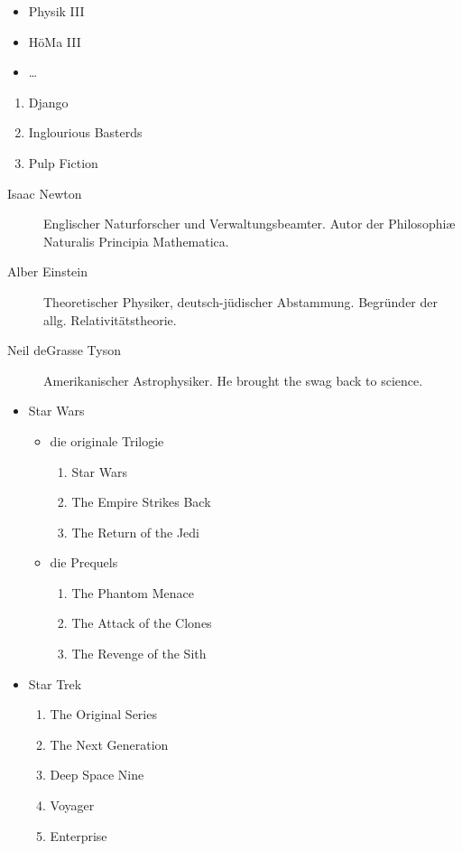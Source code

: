 \documentclass{scrartcl}
\begin{document}
\begin{itemize}
  \item Physik III
  \item HöMa III
  \item …
\end{itemize}

\begin{enumerate}
  \item Django
  \item Inglourious Basterds
  \item Pulp Fiction
\end{enumerate}

\begin{description}
  \item[Isaac Newton] Englischer Naturforscher und Verwaltungsbeamter.
    Autor der Philosophiæ Naturalis Principia Mathematica.
  \item[Alber Einstein] Theoretischer Physiker, deutsch-jüdischer Abstammung.
    Begründer der allg. Relativitätstheorie.
  \item[Neil deGrasse Tyson] Amerikanischer Astrophysiker.
    He brought the swag back to science.
\end{description}

\begin{itemize}
  \item Star Wars
    \begin{itemize}
      \item die originale Trilogie
        \begin{enumerate}
          \item Star Wars
          \item The Empire Strikes Back
          \item The Return of the Jedi
        \end{enumerate}
      \item die Prequels
        \begin{enumerate}
          \item The Phantom Menace
          \item The Attack of the Clones
          \item The Revenge of the Sith
        \end{enumerate}
    \end{itemize}
  \item Star Trek
    \begin{enumerate}
      \item The Original Series
      \item The Next Generation
      \item Deep Space Nine
      \item Voyager
      \item Enterprise
    \end{enumerate}
\end{itemize}
\end{document}
